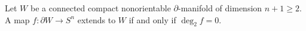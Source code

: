Let $W$ be a connected compact nonorientable $\partial$-manifold of dimension $n + 1 \geqslant 2$. A map $f: \partial W \to S^n$ extends to $W$ if and only if $\deg_2 f = 0$.
